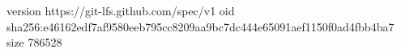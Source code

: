 version https://git-lfs.github.com/spec/v1
oid sha256:e46162edf7af9580eeb795cc8209aa9bc7dc444e65091aef1150f0ad4fbb4ba7
size 786528
